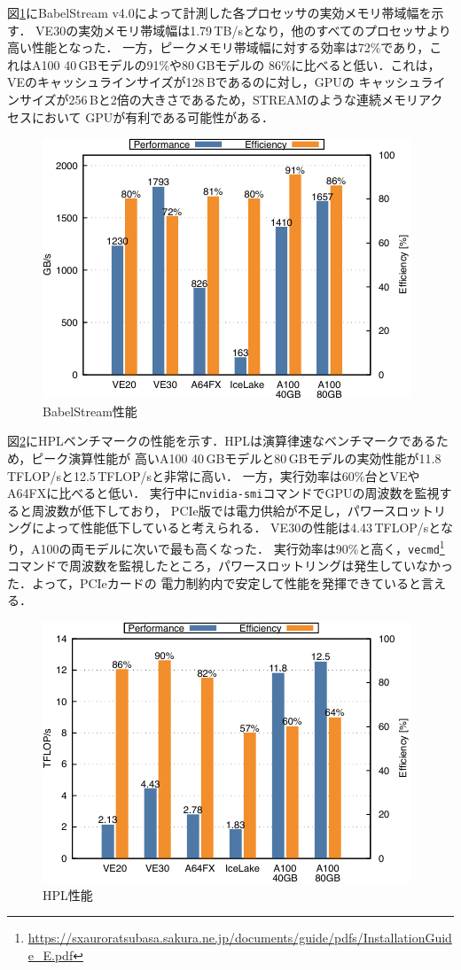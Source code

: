 ﻿\documentclass[submit,techrep,noauthor]{ipsj}
\begin{document}
図\ref{fig:stream}にBabelStream v4.0によって計測した各プロセッサの実効メモリ帯域幅を示す．
VE30の実効メモリ帯域幅は1.79\,TB/sとなり，他のすべてのプロセッサより高い性能となった．
一方，ピークメモリ帯域幅に対する効率は72\%であり，これはA100 40\,GBモデルの91\%や80\,GBモデルの
86\%に比べると低い．これは，VEのキャッシュラインサイズが128\,Bであるのに対し，GPUの
キャッシュラインサイズが256\,Bと2倍の大きさであるため，STREAMのような連続メモリアクセスにおいて
GPUが有利である可能性がある．

\begin{figure}[tb]
  \centering
  \includegraphics{figs/stream.pdf}
  \caption{BabelStream性能~\cite{Takahashi2023}}\label{fig:stream}
\end{figure}

図\ref{fig:hpl}にHPLベンチマークの性能を示す．HPLは演算律速なベンチマークであるため，ピーク演算性能が
高いA100 40\,GBモデルと80\,GBモデルの実効性能が11.8\,TFLOP/sと12.5\,TFLOP/sと非常に高い．
一方，実行効率は60\%台とVEやA64FXに比べると低い．
実行中に\verb|nvidia-smi|コマンドでGPUの周波数を監視すると周波数が低下しており，
PCIe版では電力供給が不足し，パワースロットリングによって性能低下していると考えられる．
VE30の性能は4.43\,TFLOP/sとなり，A100の両モデルに次いで最も高くなった．
実行効率は90\%と高く，\verb|vecmd|\footnote{\url{https://sxauroratsubasa.sakura.ne.jp/documents/guide/pdfs/InstallationGuide_E.pdf}}
コマンドで周波数を監視したところ，パワースロットリングは発生していなかった．よって，PCIeカードの
電力制約内で安定して性能を発揮できていると言える．

\begin{figure}[tb]
  \centering
  \includegraphics{figs/hpl.pdf}
  \caption{HPL性能~\cite{Takahashi2023}}\label{fig:hpl}
\end{figure}
\end{document}
